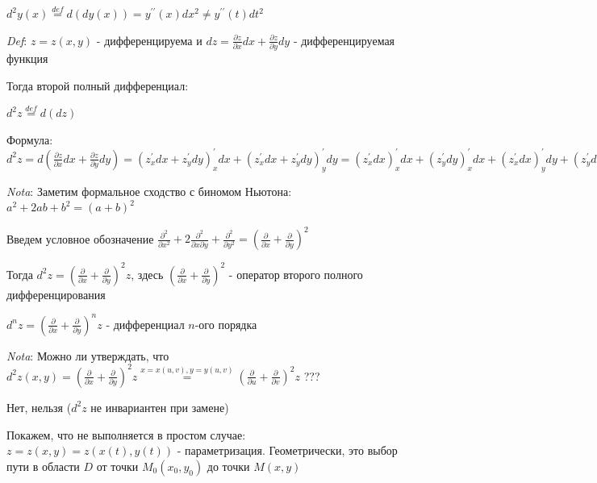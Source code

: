 \documentclass[12pt]{article}
\begin{document}
    \Mem $\displaystyle d^2 y(x) \stackrel{def}{=} d(dy(x)) = y^{\prime\prime}(x) dx^2 \neq y^{\prime\prime}(t) dt^2$

    \vspace{3mm}
    
    \textit{Def}: $\displaystyle z = z(x, y)$ - дифференцируема и $\displaystyle dz = \frac{\partial z}{\partial x}dx + \frac{\partial z}{\partial y}dy$ - дифференцируемая функция

    Тогда второй полный дифференциал:

    $\displaystyle d^2 z \stackrel{def}{=} d(dz)$

    Формула: $\displaystyle d^2 z = d\left(\frac{\partial z}{\partial x}dx + \frac{\partial z}{\partial y}dy\right) = (z^\prime_x dx + z^\prime_y dy)^\prime_x dx + (z^\prime_x dx + z^\prime_y dy)^\prime_y dy =
    (z^\prime_x dx)^\prime_x dx + (z^\prime_y dy)^\prime_x dx + (z^\prime_x dx)^\prime_y dy + (z^\prime_y dy)^\prime_y dy =
    (z^\prime_x)^\prime_x (dx)^2 + (z^\prime_y)^\prime_x dxdy + (z^\prime_x)^\prime_y dydx + (z^\prime_y)^\prime_y (dy)^2 =
    \frac{\partial^2 z}{\partial x^2} (dx)^2 + 2 \frac{\partial^2 z}{\partial x \partial y} dxdy + \frac{\partial^2 z}{\partial y^2} (dy)^2$

    \textit{Nota}: Заметим формальное сходство с биномом Ньютона: $\displaystyle a^2 + 2ab + b^2 = (a + b)^2$

    Введем условное обозначение $\displaystyle \frac{\partial^2}{\partial x^2} + 2 \frac{\partial^2}{\partial x \partial y} + \frac{\partial^2}{\partial y^2} = \left(\frac{\partial}{\partial x} + \frac{\partial}{\partial y}\right)^2$

    Тогда $\displaystyle d^2 z = \left(\frac{\partial}{\partial x} + \frac{\partial}{\partial y}\right)^2 z$, здесь $\displaystyle \left(\frac{\partial}{\partial x} + \frac{\partial}{\partial y}\right)^2$ - оператор второго полного дифференцирования

    $\displaystyle d^n z = \left(\frac{\partial}{\partial x} + \frac{\partial}{\partial y}\right)^n z$ - дифференциал $\displaystyle n$-ого порядка

    \textit{Nota}: Можно ли утверждать, что $\displaystyle d^2 z(x, y) = \left(\frac{\partial}{\partial x} + \frac{\partial}{\partial y}\right)^2 z \stackrel{x = x(u, v), y = y(u, v)}{=} \left(\frac{\partial}{\partial u} + \frac{\partial}{\partial v}\right)^2 z$ ???

    Нет, нельзя ($d^2 z$ не инвариантен при замене)

    Покажем, что не выполняется в простом случае: $\displaystyle z  = z(x, y) = z(x(t), y(t))$ - параметризация.
    Геометрически, это выбор пути в области $\displaystyle D$ от точки $\displaystyle M_0(x_0, y_0)$ до точки $\displaystyle M(x, y)$
\end{document}
